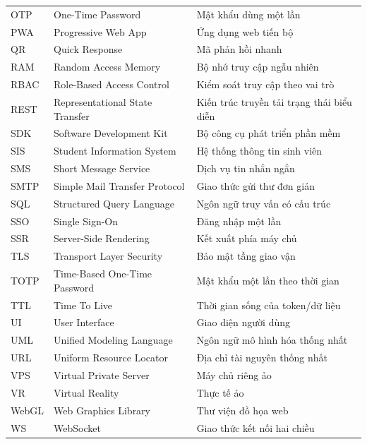 \documentclass[../DoAn.tex]{subfiles}
\begin{document}
\begin{longtable}{p{3cm} p{5cm} p{6cm}}
    OTP     & One-Time Password                  & Mật khẩu dùng một lần \\[3pt]
    PWA     & Progressive Web App                & Ứng dụng web tiến bộ \\[3pt]
    QR      & Quick Response                     & Mã phản hồi nhanh \\[3pt]
    RAM     & Random Access Memory               & Bộ nhớ truy cập ngẫu nhiên \\[3pt]
    RBAC    & Role-Based Access Control          & Kiểm soát truy cập theo vai trò \\[3pt]
    REST    & Representational State Transfer     & Kiến trúc truyền tải trạng thái biểu diễn \\[3pt]
    SDK     & Software Development Kit           & Bộ công cụ phát triển phần mềm \\[3pt]
    SIS     & Student Information System         & Hệ thống thông tin sinh viên \\[3pt]
    SMS     & Short Message Service              & Dịch vụ tin nhắn ngắn \\[3pt]
    SMTP    & Simple Mail Transfer Protocol      & Giao thức gửi thư đơn giản \\[3pt]
    SQL     & Structured Query Language          & Ngôn ngữ truy vấn có cấu trúc \\[3pt]
    SSO     & Single Sign-On                     & Đăng nhập một lần \\[3pt]
    SSR     & Server-Side Rendering              & Kết xuất phía máy chủ \\[3pt]
    TLS     & Transport Layer Security           & Bảo mật tầng giao vận \\[3pt]
    TOTP    & Time-Based One-Time Password       & Mật khẩu một lần theo thời gian \\[3pt]
    TTL     & Time To Live                       & Thời gian sống của token/dữ liệu \\[3pt]
    UI      & User Interface                     & Giao diện người dùng \\[3pt]
    UML     & Unified Modeling Language          & Ngôn ngữ mô hình hóa thống nhất \\[3pt]
    URL     & Uniform Resource Locator           & Địa chỉ tài nguyên thống nhất \\[3pt]
    VPS     & Virtual Private Server             & Máy chủ riêng ảo \\[3pt]
    VR      & Virtual Reality                    & Thực tế ảo \\[3pt]
    WebGL   & Web Graphics Library               & Thư viện đồ họa web \\[3pt]
    WS      & WebSocket                          & Giao thức kết nối hai chiều \\
    \bottomrule
\end{longtable}
\end{document}
